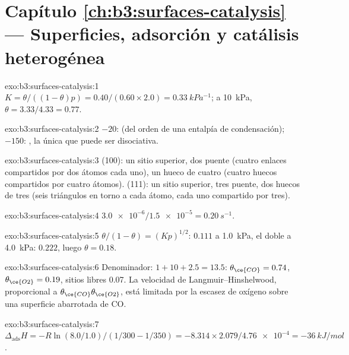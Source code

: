 \section*{Capítulo \ref{ch:b3:surfaces-catalysis} --- Superficies, adsorción y catálisis heterogénea}

\begin{solution}{exo:b3:surfaces-catalysis:1}
$K = \theta/((1 - \theta)p) = 0.40/(0.60 \times 2.0) = \qty{0.33}{kPa^{-1}}$; a \qty{10}{kPa}, $\theta = 3.33/4.33 = 0.77$.
\end{solution}

\begin{solution}{exo:b3:surfaces-catalysis:2}
$-20$:  (del orden de una entalpía de condensación); $-150$: , la única
que puede ser disociativa.
\end{solution}

\begin{solution}{exo:b3:surfaces-catalysis:3}
(100): un sitio superior, dos puente (cuatro enlaces compartidos por dos átomos cada uno), un hueco de
cuatro (cuatro huecos compartidos por cuatro átomos). (111): un sitio superior, tres puente, dos
huecos de tres (seis triángulos en torno a cada átomo, cada uno compartido por tres).
\end{solution}

\begin{solution}{exo:b3:surfaces-catalysis:4}
$\num{3.0e-6}/\num{1.5e-5} = \qty{0.20}{s^{-1}}$.
\end{solution}

\begin{solution}{exo:b3:surfaces-catalysis:5}
$\theta/(1 - \theta) = (Kp)^{1/2}$: $0.111$ a \qty{1.0}{kPa}, el doble a \qty{4.0}{kPa}: $0.222$, luego $\theta = 0.18$.
\end{solution}

\begin{solution}{exo:b3:surfaces-catalysis:6}
Denominador: $1 + 10 + 2.5 = 13.5$: $\theta_{\ce{CO}} = 0.74$, $\theta_{\ce{O2}} = 0.19$, sitios libres 0.07. La
velocidad de Langmuir--Hinshelwood, proporcional a $\theta_{\ce{CO}}\theta_{\ce{O2}}$, está limitada por la
escasez de oxígeno sobre una superficie abarrotada de CO.
\end{solution}

\begin{solution}{exo:b3:surfaces-catalysis:7}
$\Delta_{\mathrm{ads}}H = -R\ln(8.0/1.0)/(1/300 - 1/350) = -8.314 \times 2.079/\num{4.76e-4} = \qty{-36}{kJ/mol}$.
\end{solution}

